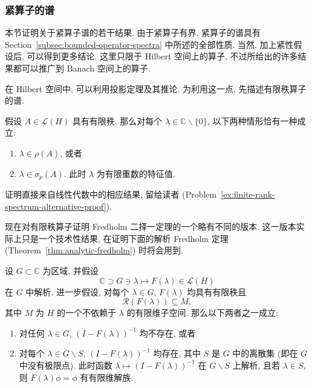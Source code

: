 \subsubsection{紧算子的谱}\label{subsec:compact-operator-spectrum}

本节证明关于紧算子谱的若干结果. 由于紧算子有界, 紧算子的谱具有 Section~\ref{subsec:bounded-operator-spectra} 中所述的全部性质. 当然, 加上紧性假设后, 可以得到更多结论. 这里只限于 Hilbert 空间上的算子, 不过所给出的许多结果都可以推广到 Banach 空间上的算子.

在 Hilbert 空间中, 可以利用投影定理及其推论. 为利用这一点, 先描述有限秩算子的谱.

\begin{Lemma}
\label{lem:finite-rank-spectrum-alternative}
假设 $A\in\mathcal{L}(H)$ 具有有限秩. 那么对每个 $\lambda\in\mathbb{C}\backslash\{0\}$, 以下两种情形恰有一种成立:\begin{enumerate}\item $\lambda\in\rho(A)$, 或者\item $\lambda\in\sigma_p(A)$. 此时 $\lambda$ 为有限重数的特征值.\end{enumerate}
\end{Lemma}

证明直接来自线性代数中的相应结果, 留给读者 (Problem~\ref{ex:finite-rank-spectrum-alternative-proof}).

现在对有限秩算子证明 Fredholm 二择一定理的一个略有不同的版本. 这一版本实际上只是一个技术性结果, 在证明下面的解析 Fredholm 定理 (Theorem~\ref{thm:analytic-fredholm}) 时将会用到.

\begin{Lemma}
\label{lem:analytic-finite-rank-alternative}
设 $G\subset\mathbb{C}$ 为区域, 并假设
\begin{equation}\label{eq:analytic-finite-rank-operator-family}
\mathbb{C}\supset G\ni\lambda\mapsto F(\lambda)\in\mathcal{L}(H)
\end{equation}
在 $G$ 中解析. 进一步假设, 对每个 $\lambda\in G$, $F(\lambda)$ 均具有有限秩且
\begin{equation}\label{eq:analytic-finite-rank-fixed-range-subspace}
\mathcal{R}(F(\lambda))\subseteq M,
\end{equation}
其中 $M$ 为 $H$ 的一个不依赖于 $\lambda$ 的有限维子空间. 那么以下两者之一成立:\begin{enumerate}\item 对任何 $\lambda\in G$, $(I-F(\lambda))^{-1}$ 均不存在, 或者\item 对每个 $\lambda\in G\backslash S$, $(I-F(\lambda))^{-1}$ 均存在, 其中 $S$ 是 $G$ 中的离散集 (即在 $G$ 中没有极限点). 此时函数 $\lambda\mapsto(I-F(\lambda))^{-1}$ 在 $G\backslash S$ 上解析, 且若 $\lambda\in S$, 则 $F(\lambda)\phi=\phi$ 有有限维解族.\end{enumerate}
\end{Lemma}

